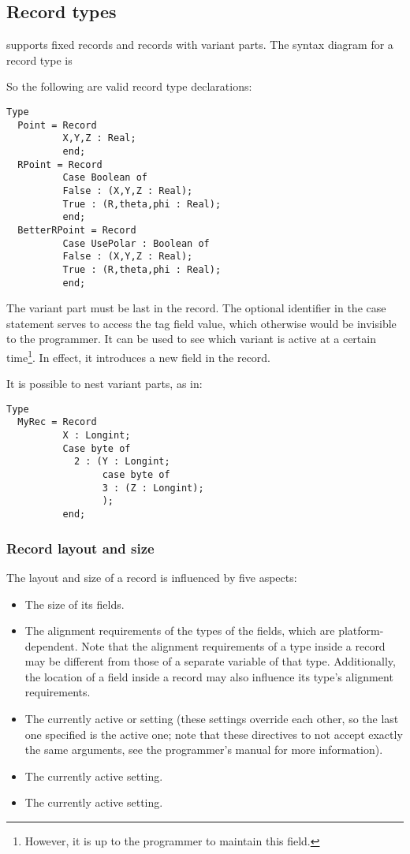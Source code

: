 \subsection{Record types}
\fpc supports fixed records and records with variant parts.
The syntax diagram for a record type is

 So the following are valid record type declarations:
\begin{verbatim}
Type
  Point = Record
          X,Y,Z : Real;
          end;
  RPoint = Record
          Case Boolean of
          False : (X,Y,Z : Real);
          True : (R,theta,phi : Real);
          end;
  BetterRPoint = Record
          Case UsePolar : Boolean of
          False : (X,Y,Z : Real);
          True : (R,theta,phi : Real);
          end;
\end{verbatim}
The variant part must be last in the record. The optional identifier in the
case statement serves to access the tag field value, which otherwise would
be invisible to the programmer. It can be used to see which variant is
active at a certain time\footnote{However, it is up to the programmer to maintain
this field.}. In effect, it introduces a new field in the record.
\begin{remark}
It is possible to nest variant parts, as in:
\begin{verbatim}
Type
  MyRec = Record
          X : Longint;
          Case byte of
            2 : (Y : Longint;
                 case byte of
                 3 : (Z : Longint);
                 );
          end;
\end{verbatim}
\end{remark}

\subsubsection{Record layout and size}

The layout and size of a record is influenced by five aspects:
\begin{itemize}
\item The size of its fields.
\item The alignment requirements of the types of the fields, which are
platform-dependent. Note that the alignment requirements of a type
inside a record may be different from those of a separate variable of
that type. Additionally, the location of a field inside a record may
also influence its type's alignment requirements.
\item The currently active  or  setting (these settings override each other, so the last one
specified is the active one; note that these directives to not accept
exactly the same arguments, see the programmer's manual for more
information).
\item The currently active  setting.
\item The currently active  setting.
\end{itemize}

